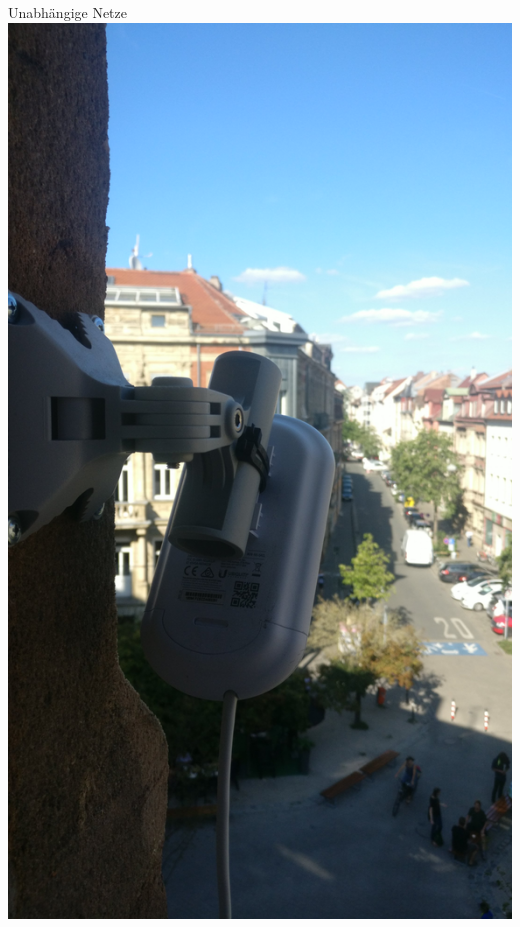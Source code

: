 \documentclass{beamer}
\begin{document}
	\begin{frame}[standout]{Unabhängige Netze}
		\includegraphics[height=0.9\textheight]{media/ap-unabhaengig.jpg}
	\end{frame}
\end{document}

